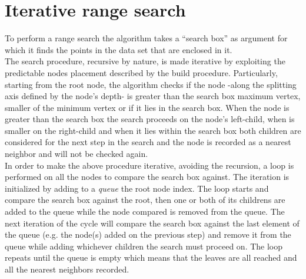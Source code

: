 \section{Iterative range search}
To perform a range search the algorithm takes a ``search box'' as argument for which it finds the points in the data set that are enclosed in it.\\
The search procedure, recursive by nature, is made iterative by exploiting the predictable nodes placement described by the build procedure. Particularly, starting from the root node, the algorithm checks if the node -along the splitting axis defined by the node's depth- is greater than the search box maximum vertex, smaller of the minimum vertex or if it lies in the search box. When the node is greater than the search box the search proceeds on the node's left-child, when is smaller on the right-child and when it lies within the search box both children are considered for the next step in the search and the node is recorded as a nearest neighbor and will not be checked again.\\
In order to make the above procedure iterative, avoiding the recursion, a loop is performed on all the nodes to compare the search box against. The iteration is initialized by adding to a \textit{queue} the root node index. The loop starts and compare the search box against the root, then one or both of its childrens are added to the queue while the node compared is removed from the queue. The next iteration of the cycle will compare the search box against the last element of the queue (e.g. the node(s) added on the previous step) and remove it from the queue while adding whichever children the search must proceed on. The loop repeats until the queue is empty which means that the leaves are all reached and all the nearest neighbors recorded.\\

